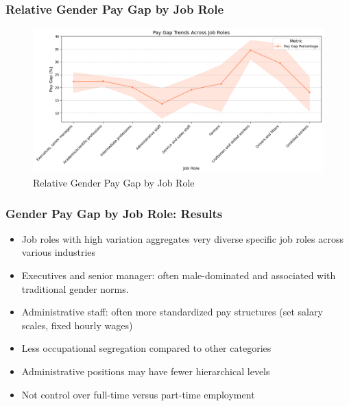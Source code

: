 \documentclass{beamer}
\begin{document}
\begin{frame}
\frametitle{Relative Gender Pay Gap by Job Role}
\begin{center}
\begin{figure}[H]
    \includegraphics[width=\textwidth]{Figures/Pay_Gap_Trends_by_Job_Role.png}
    \caption{Relative Gender Pay Gap by Job Role}
    \label{fig:relative_gap_roles}
\end{figure}
\end{center}
\end{frame}



\begin{frame}
\frametitle{Gender Pay Gap by Job Role: Results}
\begin{center}
  \begin{itemize}
    \item Job roles with high variation aggregates very diverse specific job roles across
various industries
    \item Executives and senior manager: often male-dominated and associated with traditional gender norms.
    \item Administrative staff: often more standardized pay structures (set salary scales, fixed hourly wages)
    \item Less occupational segregation compared to other categories
    \item Administrative positions may have fewer hierarchical levels
    \item Not control over full-time versus part-time employment
\end{itemize} 
\end{center}
\end{frame}
\end{document}
